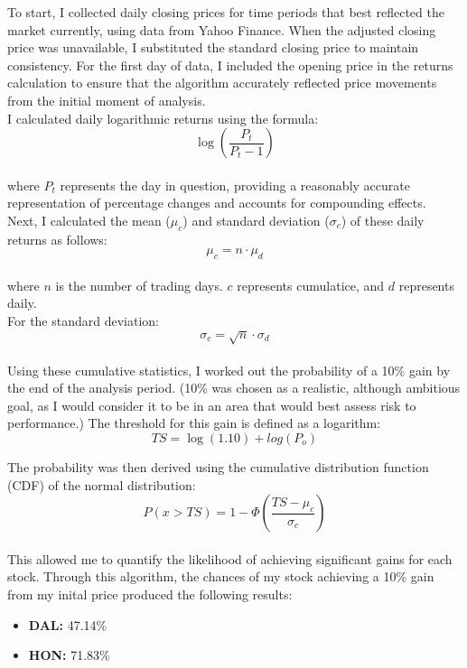 \documentclass[a4paper, 12pt]{article}
\begin{document}
To start, I collected daily closing prices for time periods that best reflected
the market currently, using data from Yahoo Finance. When the adjusted 
closing price was unavailable, I substituted the standard closing price to 
maintain consistency. For the first day of data, I included the opening 
price in the returns calculation to ensure that the algorithm accurately 
reflected price movements from the 
initial moment of analysis. \\

I calculated daily logarithmic returns using the formula: \\
\[
\log (\frac{P_t}{P_t-1})
\] \\
where $P_t$ represents the day in question, providing a reasonably accurate
 representation of percentage changes and accounts for compounding effects. \\

Next, I calculated the mean ($\mu_c$) and standard deviation ($\sigma_c$) of
these daily returns as follows: \\
\[
    \mu_c = n \cdot \mu_d
\] \\
where $n$ is the number of trading days. $c$ represents cumulatice, and 
$d$ represents daily. \\

For the standard deviation: \\
\[
    \sigma_c = \sqrt{n} \cdot \sigma_d
\] \\
Using these cumulative statistics, I worked out the probability of a 10\% gain
by the end of the analysis period. (10\% was chosen as a realistic, although
ambitious goal, as I would consider it to be in an area that would best assess
risk to performance.) The threshold for this gain is defined as
a logarithm: \\
\[
    TS = \log(1.10) + log(P_o)
\] 

The probability was then derived using the cumulative distribution function
(CDF) of the normal distribution: \\
\[
    P(x > TS) = 1 - \Phi (\frac{TS - \mu_c}{\sigma_c})
\] \\

This allowed me to quantify the likelihood of achieving significant gains for
each stock. Through this algorithm, the chances of my stock achieving a 10\%
gain from my inital price produced the following results: \\
\begin{itemize}
    \item \textbf{DAL:} 47.14\%
    \item \textbf{HON:} 71.83\%
\end{itemize}
\end{document}
